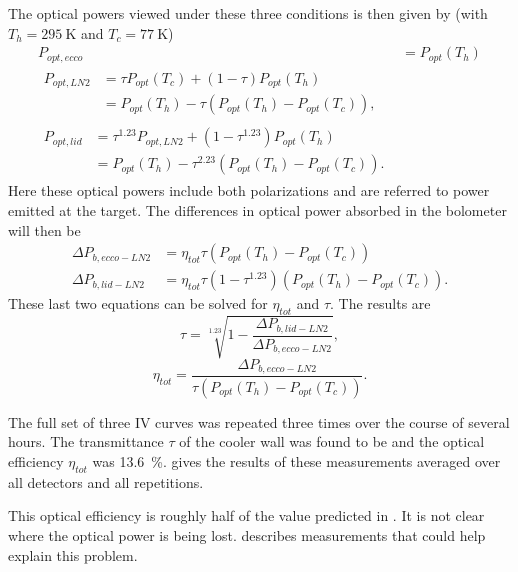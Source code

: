 The optical powers viewed under these three conditions is then given by (with $T_h = \SI{295}{\K}$ and $T_c = \SI{77}{\K}$)
\begin{align}
  P_{opt,ecco}  & = P_{opt}(T_h) \\
  \begin{split}
    P_{opt,LN2} & = \tau P_{opt}(T_c) + (1-\tau)P_{opt}(T_h) \\
              & = P_{opt}(T_h) - \tau (P_{opt}(T_h) - P_{opt}(T_c)),
  \end{split} \\
  \begin{split}
    P_{opt,lid} & = \tau^{1.23} P_{opt,LN2} + (1-\tau^{1.23})P_{opt}(T_h) \\
              & = P_{opt}(T_h) - \tau^{2.23}(P_{opt}(T_h) - P_{opt}(T_c)) .
  \end{split}
\end{align}
Here these optical powers include both polarizations and are referred to power emitted at the target.
The differences in optical power absorbed in the bolometer will then be
\begin{align}
  \Delta P_{b,ecco-LN2} & = \eta_{tot} \tau (P_{opt}(T_h) - P_{opt}(T_c)) \\
  \Delta P_{b,lid-LN2}  & = \eta_{tot} \tau (1-\tau^{1.23}) (P_{opt}(T_h) - P_{opt}(T_c)).
\end{align}
These last two equations can be solved for $\eta_{tot}$ and $\tau$. The results are
\begin{equation}
   \tau = \sqrt[1.23]{1 - \frac{\Delta P_{b,lid-LN2}}{\Delta P_{b,ecco-LN2}}},
\end{equation}
\begin{equation}
   \eta_{tot} = \frac{\Delta P_{b,ecco-LN2}}{ \tau ( P_{opt}(T_h) - P_{opt}(T_c) )} .
\end{equation}

The full set of three IV curves was repeated three times over the course of several hours.
The transmittance $\tau$ of the cooler wall was found to be  and the optical efficiency $\eta_{tot}$ was \SI{13.6}{\percent}. 
 gives the results of these measurements averaged over all detectors and all repetitions.

This optical efficiency is roughly half of the value predicted in .
It is not clear where the optical power is being lost.
 describes measurements that could help explain this problem.

